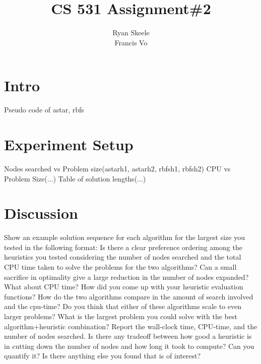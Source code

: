 \documentclass[11pt]{article}
\title{CS 531 Assignment\#2}
\author{
    Ryan Skeele\\
    Francis Vo
}
\date{}
\begin{document}
\maketitle
\section*{Intro}
Pseudo code of astar, rbfs
\section{Experiment Setup}
Nodes searched vs Problem size(astarh1, astarh2, rbfsh1, rbfsh2)
CPU vs Problem Size(...)
Table of solution lengths(...)
\section*{Discussion}
Show an example solution sequence for each algorithm for the largest size you tested in the following format:
Is there a clear preference ordering among the heuristics you tested considering the number of nodes searched and the total CPU time taken to solve the problems for the two algorithms?
Can a small sacrifice in optimality give a large reduction in the number of nodes expanded? What about CPU time?
How did you come up with your heuristic evaluation functions?
How do the two algorithms compare in the amount of search involved and the cpu-time?
Do you think that either of these algorithms scale to even larger problems? What is the largest problem you could solve with the best algorithm+heuristic combination? Report the wall-clock time, CPU-time, and the number of nodes searched.
Is there any tradeoff between how good a heuristic is in cutting down the number of nodes and how long it took to compute? Can you quantify it?
Is there anything else you found that is of interest?
\end{document}
